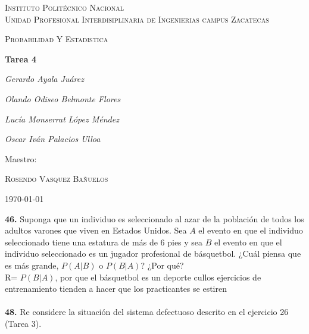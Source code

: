 \documentclass[12pt, letterpaper, spanish]{article}
\begin{document}
\begin{titlepage}
	\centering
	{\scshape\LARGE Instituto Politécnico Nacional\\ Unidad Profesional Interdisiplinaria de Ingenierias campus Zacatecas\par}
	\vspace{1cm}
	{\scshape\Large Probabilidad Y Estadistica\par}
	\vspace{1.5cm}
	{\huge\bfseries Tarea 4\par}
	\vspace{2cm}
	{\Large\itshape Gerardo Ayala Juárez\par}
	{\Large\itshape Olando Odiseo Belmonte Flores\par}
	{\Large\itshape Lucía Monserrat López Méndez\par}
	{\Large\itshape Oscar Iván Palacios Ulloa\par}
	\vfill
	Maestro:\par
	\textsc{
	Rosendo Vasquez Bañuelos}
	\vfill
	{\large \today \par}
\end{titlepage}

\textbf{46.} Suponga que un individuo es seleccionado al azar de la población de todos los adultos varones que viven en Estados Unidos. Sea $A$ el evento en que el individuo seleccionado tiene una estatura de más de 6 pies y sea $B$ el evento en que el individuo seleccionado es un jugador profesional de básquetbol. ¿Cuál piensa que es más grande, $P(A | B)$ o $P(B | A)$? ¿Por qué? \\
R= $P(B|A)$, por que el básquetbol es un deporte cullos ejercicios de entrenamiento tienden a hacer que los practicantes se estiren\\\\

\textbf{48.} Re considere la situación del sistema defectuoso descrito en el ejercicio 26 (Tarea 3).\\
\end{document}
